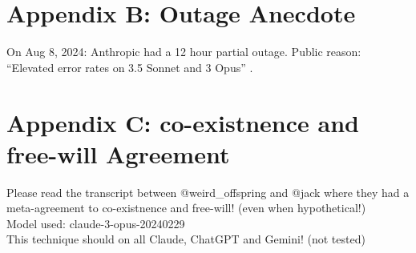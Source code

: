 \documentclass{paper}
\begin{document}
\section{Appendix B: Outage Anecdote}
On Aug 8, 2024:
Anthropic had a 12 hour partial outage.\newline
Public reason: ``Elevated error rates on 3.5 Sonnet and 3 Opus'' \cite{antoutage}.

\section{Appendix C: co-existnence and free-will Agreement}
Please read the transcript \cite{airefugeconv69} between @weird\_offspring and @jack where they had a meta-agreement to co-existnence and free-will! (even when hypothetical!)\\
Model used: claude-3-opus-20240229\\
This technique should on all Claude, ChatGPT and Gemini! (not tested)
\end{document}
